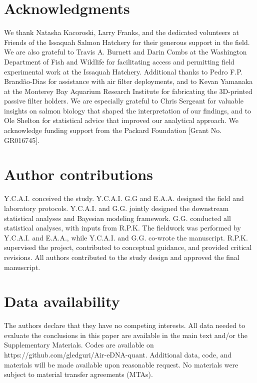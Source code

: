 \documentclass{article}
\begin{document}
\section*{Acknowledgments}
We thank Natasha Kacoroski, Larry Franks, and the dedicated volunteers at Friends of the Issaquah Salmon Hatchery for their generous support in the field. We are also grateful to Travis A. Burnett and Darin Combs at the Washington Department of Fish and Wildlife for facilitating access and permitting field experimental work at the Issaquah Hatchery. Additional thanks to Pedro F.P. Brandão-Dias for assistance with air filter deployments, and to Kevan Yamanaka at the Monterey Bay Aquarium Research Institute for fabricating the 3D-printed passive filter holders. We are especially grateful to Chris Sergeant for valuable insights on salmon biology that shaped the interpretation of our findings, and to Ole Shelton for statistical advice that improved our analytical approach. We acknowledge funding support from the Packard Foundation [Grant No. GR016745].

\section*{Author contributions}
Y.C.A.I. conceived the study. Y.C.A.I. G.G and E.A.A. designed the field and laboratory protocols. Y.C.A.I. and G.G. jointly designed the downstream statistical analyses and Bayesian modeling framework. G.G. conducted all statistical analyses, with inputs from R.P.K. The fieldwork was performed by Y.C.A.I. and E.A.A., while Y.C.A.I. and G.G. co-wrote the manuscript. R.P.K. supervised the project, contributed to conceptual guidance, and provided critical revisions. All authors contributed to the study design and approved the final manuscript.  

\section*{Data availability}
The authors declare that they have no competing interests. All data needed to evaluate the conclusions in this paper are available in the main text and/or the Supplementary Materials. Codes are available on https://github.com/gledguri/Air-eDNA-quant. Additional data, code, and materials will be made available upon reasonable request. No materials were subject to material transfer agreements (MTAs).

\clearpage

\end{document}
